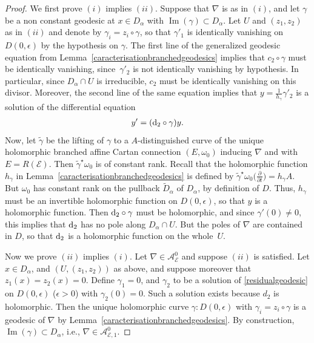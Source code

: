 \documentclass[pdftex]{sigma}
\newcommand{\der}[2]{\frac{\partial #1}{\partial#2}}
\numberwithin{equation}{section}
\begin{document}
\begin{proof}
We first prove $(i)$ implies $(ii)$. Suppose that $\nabla$ is as in $(i)$, and let $\gamma$ be a non constant geodesic at $x\in D_\alpha$ with $\operatorname{Im}(\gamma)\subset D_\alpha$. Let $U$ and $(z_1,z_2)$ as in $(ii)$ and denote by $\gamma_i = z_i \circ \gamma$, so that $\gamma'_1$ is identically vanishing on $D(0,\epsilon)$ by the hypothesis on $\gamma$. The first line of the generalized geodesic equation from Lemma~\ref{caracterisationbranchedgeodesics} implies that $c_2 \circ \gamma$ must be identically vanishing, since~$\gamma'_2$ is not identically vanishing by hypothesis. In particular, since $D_\alpha \cap U$ is irreducible, $c_2$ must be identically vanishing on this divisor.
Moreover, the second line of the same equation implies that $y=\frac{1}{h_\gamma} \gamma'_2$ is a solution of the differential equation
 \begin{gather}\label{residualgeodesic} y'= ({\rm d}_2\circ \gamma) y. \end{gather}
 Now, let $\tilde{\gamma}$ be the lifting of $\gamma$ to a $A$-distinguished curve of the unique holomorphic branched affine Cartan connection $(E,\omega_0)$ inducing $\nabla$ and with $E=R(\mathcal{E})$. Then $\tilde{\gamma}^\star \omega_0$ is of constant rank. Recall that the holomorphic function $h_\gamma$ in Lemma~\ref{caracterisationbranchedgeodesics} is defined by $\tilde{\gamma}^\star \omega_0\big(\der{}{t}\big) = h_\gamma A$. But $\omega_0$ has constant rank on the pullback $\tilde{D}_\alpha$ of $D_\alpha$, by definition of $D$. Thus, $h_\gamma$ must be an invertible holomorphic function on $D(0,\epsilon)$, so that $y$ is a holomorphic function. Then ${\rm d}_2\circ \gamma$ must be holomorphic, and since $\gamma'(0)\neq 0$, this implies that ${\rm d}_2$ has no pole along $D_\alpha \cap U$. But the poles of $\nabla$ are contained in $D$, so that ${\rm d}_2$ is a holomorphic function on the whole~$U$.

Now we prove $(ii)$ implies $(i)$. Let $\nabla \in \mathcal{A}^0_\mathcal{E}$ and suppose $(ii)$ is satisfied. Let $x \in D_\alpha$, and $(U,(z_1,z_2))$ as above, and suppose moreover that $z_1(x)=z_2(x)=0$. Define $\gamma_1 =0$, and $\gamma_2$ to be a solution of \eqref{residualgeodesic} on $D(0,\epsilon)$ ($\epsilon >0$) with $\gamma_2(0)=0$. Such a solution exists because $d_2$ is holomorphic. Then the unique holomorphic curve $\gamma\colon D(0,\epsilon)$ with $\gamma_i = z_i \circ \gamma$ is a geodesic of $\nabla$ by Lemma~\ref{caracterisationbranchedgeodesics}. By construction, $\operatorname{Im}(\gamma)\subset D_\alpha$, i.e., $\nabla\in \mathcal{A}^0_{\mathcal{E},1}$.
\end{proof}
\end{document}
